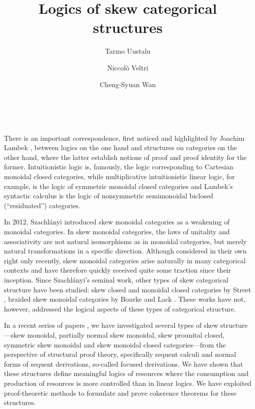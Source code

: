 \documentclass{article}
\begin{document}
\title{Logics of skew categorical structures}

\author{Tarmo Uustalu \and Niccol\`o Veltri \and Cheng-Syuan Wan}

\date{~}

\maketitle

\thispagestyle{empty}

There is an important correspondence, first noticed and highlighted by
Joachim Lambek \cite{Lam}, between logics on the one hand and structures on
categories on the other hand, where the latter establish notions of
proof and proof identity for the former. Intuitionistic logic is,
famously, the logic corresponding to Cartesian monoidal closed
categories, while multiplicative intuitionistic linear logic, for
example, is the logic of symmetric monoidal closed categories and
Lambek's syntactic calculus is the logic of nonsymmetric semimonoidal
biclosed (``residuated'') categories.

In 2012, Szachl\'anyi \cite{Szl} introduced skew monoidal categories
as a weakening of monoidal categories. In skew monoidal categories,
the laws of unitality and associativity are not natural isomorphisms
as in monoidal categories, but merely natural transformations in a
specific direction. Although considered in their own right only
recently, skew monoidal categories arise naturally in many categorical
contexts and have therefore quickly received quite some traction since
their inception. Since Szachl\'anyi's seminal work, other types of
skew categorical structure have been studied: skew closed and monoidal
closed categories by Street \cite{Str}, braided skew monoidal
categories by Bourke and Lack \cite{BL}. These works have not,
however, addressed the logical aspects of these types of categorical
structure.

In a recent series of papers
\cite{UVZ:lambek,UVZ:skpcl,UVZ:pn,Vel:ss,UVW}, we have investigated
several types of skew structure---skew monoidal, partially normal skew
monoidal, skew prounital closed, symmetric skew monoidal and skew
monoidal closed categories---from the perspective of structural proof
theory, specifically sequent calculi and normal forms of sequent
derivations, so-called focused derivations. We have shown that these
structures define meaningful logics of resources where the consumption
and production of resources is more controlled than in linear
logics. We have exploited proof-theoretic methods to formulate and
prove coherence theorems for these structures.
\end{document}
